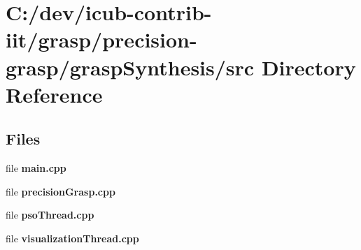 \section{C\+:/dev/icub-\/contrib-\/iit/grasp/precision-\/grasp/grasp\+Synthesis/src Directory Reference}
\label{dir_eec1d89e5185f11aea105d7bee0bc98d}
\subsection*{Files}
\begin{DoxyCompactItemize}
\item 
file {\bfseries main.\+cpp}
\item 
file {\bfseries precision\+Grasp.\+cpp}
\item 
file {\bfseries pso\+Thread.\+cpp}
\item 
file {\bfseries visualization\+Thread.\+cpp}
\end{DoxyCompactItemize}
